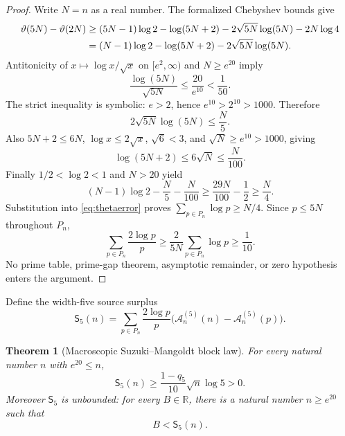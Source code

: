 \documentclass[11pt]{article}
\newtheorem{theorem}{Theorem}[section]
\newcommand{\R}{\mathbb R}
\newcommand{\A}{\mathcal A}
\newcommand{\Sur}{\mathsf S}
\begin{document}
\begin{proof}
Write $N=n$ as a real number.  The formalized Chebyshev bounds give
\begin{align}
 \vartheta(5N)-\vartheta(2N)
 &\ge (5N-1)\log2-\log(5N+2)-2\sqrt{5N}\log(5N)-2N\log4 \notag\\
 &= (N-1)\log2-\log(5N+2)-2\sqrt{5N}\log(5N).             \label{eq:thetaerror}
\end{align}
Antitonicity of $x\mapsto\log x/\sqrt x$ on $[e^2,\infty)$ and $N\ge e^{20}$ imply
\begin{equation}\label{eq:logroot}
 \frac{\log(5N)}{\sqrt{5N}}
 \le\frac{20}{e^{10}}<\frac1{50}.
\end{equation}
The strict inequality is symbolic: $e>2$, hence $e^{10}>2^{10}>1000$.  Therefore
\begin{equation}\label{eq:firsterror}
 2\sqrt{5N}\log(5N)\le\frac N5.
\end{equation}
Also $5N+2\le6N$, $\log x\le2\sqrt x$, $\sqrt6<3$, and
$\sqrt N\ge e^{10}>1000$, giving
\begin{equation}\label{eq:seconderror}
 \log(5N+2)\le6\sqrt N\le\frac N{100}.
\end{equation}
Finally $1/2<\log2<1$ and $N>20$ yield
\[
 (N-1)\log2-\frac N5-\frac N{100}
 \ge\frac{29N}{100}-\frac12\ge\frac N4.
\]
Substitution into \eqref{eq:thetaerror} proves
$\sum_{p\in P_n}\log p\ge N/4$.  Since $p\le5N$ throughout $P_n$,
\[
 \sum_{p\in P_n}\frac{2\log p}{p}
 \ge\frac2{5N}\sum_{p\in P_n}\log p
 \ge\frac1{10}.
\]
No prime table, prime-gap theorem, asymptotic remainder, or zero hypothesis enters the argument.
\end{proof}

Define the width-five source surplus
\begin{equation}\label{eq:sfivedef}
 \Sur_5(n)=\sum_{p\in P_n}\frac{2\log p}{p}
 \bigl(\A_n^{(5)}(n)-\A_n^{(5)}(p)\bigr).
\end{equation}

\begin{theorem}[Macroscopic Suzuki--Mangoldt block law]\label{thm:macro}
For every natural number $n$ with $e^{20}\le n$,
\begin{equation}\label{eq:macrolower}
 \Sur_5(n)\ge\frac{1-q_5}{10}\sqrt n\log5>0.
\end{equation}
Moreover $\Sur_5$ is unbounded: for every $B\in\R$, there is a natural number
$n\ge e^{20}$ such that
\begin{equation}\label{eq:unbounded}
 B<\Sur_5(n).
\end{equation}
\end{theorem}
\end{document}
